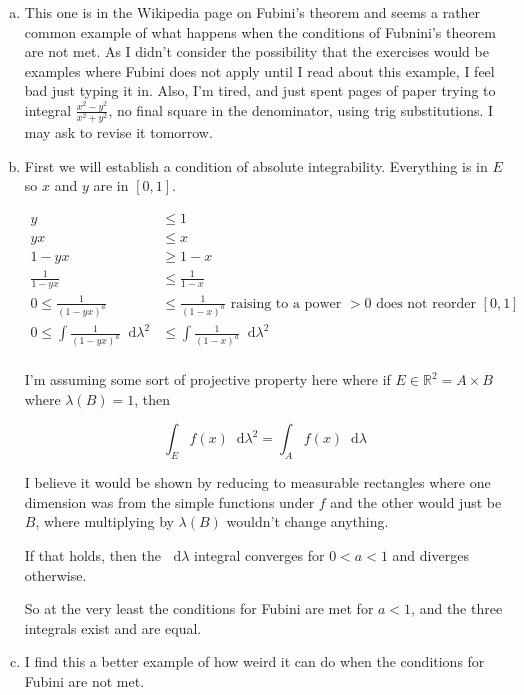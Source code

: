 \documentclass[11pt,oneside]{article}
\numberwithin{equation}{section}
\theoremstyle{definition}
\def\RR{\mathbb{R}}
\newcommand*\diff{\mathop{}\!\mathrm{d}}
\begin{document}
\begin{solution}
\begin{enumerate}[(a)]
\item
  This one is in the Wikipedia page on Fubini's theorem and seems a
  rather common example of what happens when the conditions of
  Fubnini's theorem are not met.  As I didn't consider the possibility
  that the exercises would be examples where Fubini does not apply
  until I read about this example, I feel bad just typing it in.
  Also, I'm tired, and just spent pages of paper trying to integral
  $\frac{x^2 - y^2}{x^2+y^2}$, no final square in the denominator,
  using trig substitutions. I may ask to revise it tomorrow.
  
\item
  First we will establish a condition of absolute integrability.  Everything is in $E$ so
  $x$ and $y$ are in $[0,1]$.  

  \begin{align*}
    y & \leq 1 \\
    yx & \leq x \\
    1- yx & \geq 1 - x \\
    \frac{1}{1 - yx} & \leq \frac{1}{1-x}\\
    0 \leq  \frac{1}{(1 - yx)^a} & \leq \frac{1}{(1-x)^a} \textrm{ raising to a power } >0 \textrm{ does not reorder } [0,1] \\
    0 \leq \int  \frac{1}{(1 - yx)^a} \diff \lambda^2 & \leq \int \frac{1}{(1-x)^a} \diff \lambda^2 \\
  \end{align*}

  I'm assuming some sort of projective property here where if $E \in \RR^2 = A \times B$ where
  $\lambda(B) = 1$, then

  \[
  \int _ {E} f(x) \diff \lambda^2 = \int _A f(x) \diff \lambda
  \]

  I believe it would be shown by reducing to measurable rectangles where
  one dimension was from the simple functions under $f$ and the other would just
  be $B$, where multiplying by $\lambda(B)$ wouldn't change anything.  

  If that holds, then the $\diff \lambda$ integral converges for $0 < a < 1$ and
  diverges otherwise.

  So at the very least the conditions for Fubini are met for $a<1$, and the three
  integrals exist and are equal.  
\item
  I find this a better example of how weird it can do when the
  conditions for Fubini are not met.


\end{enumerate}
\end{solution}
\end{document}
